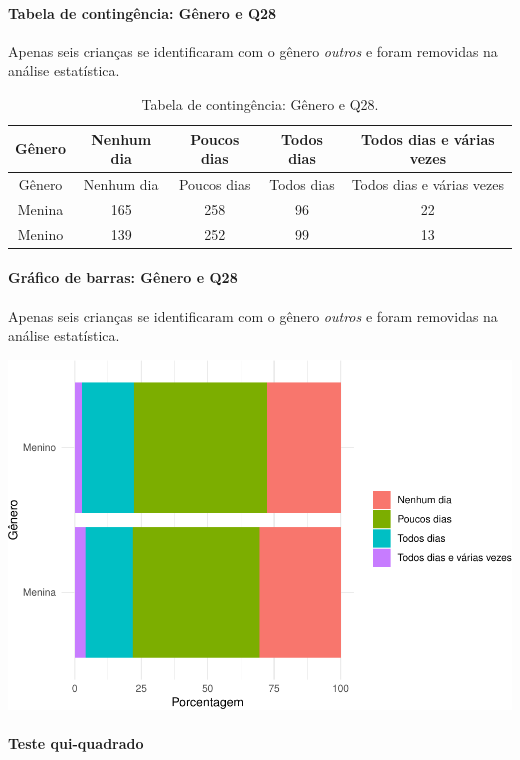 \documentclass[]{article}
\let\oldparagraph\paragraph
\renewcommand{\paragraph}[1]{\oldparagraph{#1}\mbox{}}
\begin{document}
\cleardoublepage

\hypertarget{tabela-de-continguxeancia-guxeanero-e-q28}{%
\paragraph{Tabela de contingência: Gênero e Q28}\label{tabela-de-continguxeancia-guxeanero-e-q28}}

Apenas seis crianças se identificaram com o gênero \emph{outros} e foram removidas na análise estatística.

\begin{longtable}[]{@{}ccccc@{}}
\caption{\label{tab:unnamed-chunk-848}Tabela de contingência: Gênero e Q28.}\tabularnewline
\toprule
Gênero & Nenhum dia & Poucos dias & Todos dias & Todos dias e várias vezes\tabularnewline
\midrule
\endfirsthead
\toprule
Gênero & Nenhum dia & Poucos dias & Todos dias & Todos dias e várias vezes\tabularnewline
\midrule
\endhead
Menina & 165 & 258 & 96 & 22\tabularnewline
Menino & 139 & 252 & 99 & 13\tabularnewline
\bottomrule
\end{longtable}

\hypertarget{gruxe1fico-de-barras-guxeanero-e-q28}{%
\paragraph{Gráfico de barras: Gênero e Q28}\label{gruxe1fico-de-barras-guxeanero-e-q28}}

Apenas seis crianças se identificaram com o gênero \emph{outros} e foram removidas na análise estatística.

\begin{center}\includegraphics[width=0.75\linewidth]{relatorio_covid19_files/figure-latex/unnamed-chunk-849-1} \end{center}

\hypertarget{teste-qui-quadrado-73}{%
\paragraph{Teste qui-quadrado}\label{teste-qui-quadrado-73}}
\end{document}
